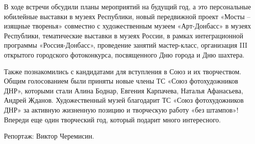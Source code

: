 
В ходе встречи обсудили планы мероприятий на будущий год, а это персональные
юбилейные выставки в музеях Республики, новый передвижной проект «Мосты –
изящные творенья» совместно с художественным музеем «Арт-Донбасс» в музеях
Республики, тематические выставки в музеях России, в рамках интеграционной
программы «Россия-Донбасс», проведение занятий мастер-класс, организация III
открытого городского фотоконкурса, посвященного Дню города и Дню шахтера.


Также познакомились с кандидатами для вступления в Союз и их творчеством. Общим
голосованием были приняты новые члены ТС «Союз фотохудожников ДНР», которыми
стали Алина Боднар, Евгения Карпачева, Наталья Афанасьева, Андрей Жданов.
Художественный музей благодарит ТС «Союз фотохудожников ДНР» за активную
жизненную позицию и творческую работу «без штампов»! Впереди еще один
творческий год, который подарит много интересного.

Репортаж: Виктор Черемисин.
